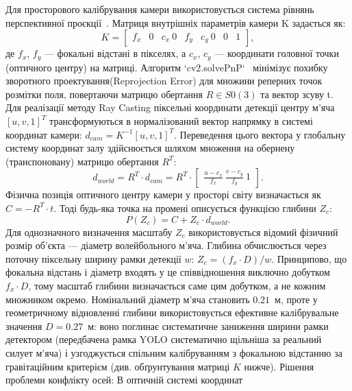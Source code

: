 Для просторового калібрування камери використовується система
рівнянь перспективної проєкції~\cite{zhang_calibration}. Матриця внутрішніх параметрів камери K
задається як:
\begin{equation}K = \begin{bmatrix} f_x & 0 & c_x \ 0 & f_y & c_y \ 0 & 0 & 1 \end{bmatrix},\end{equation}
де $f_x$, $f_y$ — фокальні відстані в пікселях, а $c_x$, $c_y$ — координати
головної точки (оптичного центру) на матриці. Алгоритм `cv2.solvePnP`~\cite{lepetit_epnp,bradski_opencv}
мінімізує похибку зворотного проектування(Reprojection Error) для множини реперних точок розмітки поля, повертаючи
матрицю обертання $R \in S0(3)$ та
вектор зсуву t.
Для реалізації методу Ray Casting піксельні координати детекції центру
м'яча $[u, v, 1]^T$ трансформуються в нормалізований вектор напрямку в
системі координат камери: $d_{cam} = K^{-1} [u, v, 1]^T$. Переведення цього
вектора у глобальну систему координат залу здійснюється шляхом множення
на обернену (транспоновану) матрицю обертання $R^T$:
\begin{equation}d_{world} = R^T \cdot d_{cam} = R^T \cdot \begin{bmatrix} \frac{u - c_x}{f_x} \ \frac{v -
c_y}{f_y} \ 1 \end{bmatrix}.\end{equation}
Фізична позиція оптичного центру камери у просторі світу визначається
як $C = -R^T \cdot t$. Тоді будь-яка точка на промені описується функцією
глибини $Z_c$:
\begin{equation}P(Z_c) = C + Z_c \cdot d_{world}.\end{equation}
Для однозначного визначення масштабу $Z_c$ використовується відомий
фізичний розмір об'єкта — діаметр волейбольного м'яча. Глибина обчислюється
через поточну піксельну ширину рамки детекції $w$: $Z_c = (f_x \cdot D) / w$.
Принципово, що фокальна відстань і діаметр входять у це співвідношення
виключно добутком $f_x \cdot D$, тому масштаб глибини визначається саме цим
добутком, а не кожним множником окремо. Номінальний діаметр м'яча становить
$0.21$~м, проте у геометричному відновленні глибини використовується ефективне
калібрувальне значення $D = 0.27$~м: воно поглинає систематичне заниження
ширини рамки детектором (передбачена рамка \gls{YOLO} систематично щільніша за
реальний силует м'яча) і узгоджується спільним калібруванням з фокальною
відстанню за гравітаційним критерієм (див. обґрунтування матриці $K$ нижче).
Рішення проблеми конфлікту осей: В оптичній системі координат
